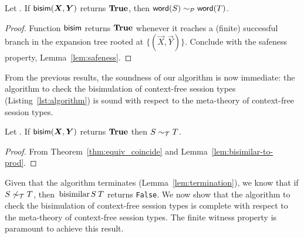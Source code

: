 
\begin{lemma}
  \label{lem:bisimilar-to-prod}
  Let \grmcontext.  If $\Bisim(\vec X,\vec Y)$ returns $\mathbf{True}$, then
  $\mathsf{word}(S) \sim_\mathcal P \mathsf{word}(T)$.
\end{lemma}

\begin{proof}
  Function $\mathsf{bisim}$ returns $\mathbf{True}$ whenever it reaches a (finite)
  successful branch in the expansion tree rooted at
  $\{(\vec X,\vec Y)\}$. Conclude with the safeness property,
  Lemma~\ref{lem:safeness}.
\end{proof}

From the previous results, the soundness of our algorithm is now
immediate: the algorithm to check the bisimulation of context-free
session types (Listing~\ref{lst:algorithm}) is sound with respect to
the meta-theory of context-free session types.

\begin{theorem}[Soundness]
  \label{thm:soundness}
  Let \grmcontext.  If $\Bisim(\vec X,\vec Y)$ returns $\mathbf{True}$ then
  $S\sim_\mathcal T T$.
\end{theorem}
%
\begin{proof}
  From Theorem~\ref{thm:equiv_coincide} and
  Lemma~\ref{lem:bisimilar-to-prod}.
\end{proof}

 
Given that the algorithm terminates (Lemma~\ref{lem:termination}), we
know that if $S\not\sim_\mathcal T T$, then $\bisimf ST$ returns
\lstinline|False|.
%
We now show that the algorithm to check the bisimulation of
context-free session types is complete with respect to the meta-theory
of context-free session types. The finite witness property is
paramount to achieve this result.

